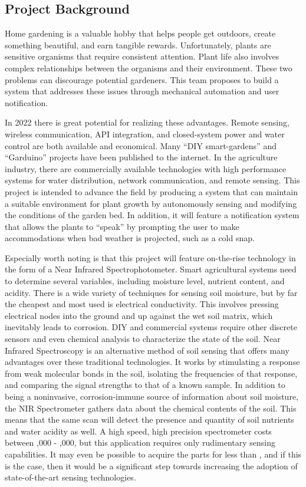 \subsection{Project Background}
Home gardening is a valuable hobby that helps people get outdoors, create something beautiful, and earn tangible rewards. Unfortunately, plants are sensitive organisms that require consistent attention. Plant life also involves complex relationships between the organisms and their environment. These two problems can discourage potential gardeners. This team proposes to build a system that addresses these issues through mechanical automation and user notification.

In 2022 there is great potential for realizing these advantages. Remote sensing, wireless communication, API integration, and closed-system power and water control are both available and economical. Many “DIY smart-gardens” and “Garduino” projects have been published to the internet. In the agriculture industry, there are commercially available technologies with high performance systems for water distribution, network communication, and remote sensing. This project is intended to advance the field by producing a system that can maintain a suitable environment for plant growth by autonomously sensing and modifying the conditions of the garden bed. In addition, it will feature a notification system that allows the plants to “speak” by prompting the user to make accommodations when bad weather is projected, such as a cold snap.

Especially worth noting is that this project will feature on-the-rise technology in the form of a Near Infrared Spectrophotometer. Smart agricultural systems need to determine several variables, including moisture level, nutrient content, and acidity. There is a wide variety of techniques for sensing soil moisture, but by far the cheapest and most used is electrical conductivity. This involves pressing electrical nodes into the ground and up against the wet soil matrix, which inevitably leads to corrosion. DIY and commercial systems require other discrete sensors and even chemical analysis to characterize the state of the soil. Near Infrared Spectroscopy is an alternative method of soil sensing that offers many advantages over these traditional technologies. It works by stimulating a response from weak molecular bonds in the soil, isolating the frequencies of that response, and comparing the signal strengths to that of a known sample. In addition to being a noninvasive, corrosion-immune source of information about soil moisture, the NIR Spectrometer gathers data about the chemical contents of the soil. This means that the same scan will detect the presence and quantity of soil nutrients and water acidity as well. A high speed, high precision spectrometer costs between ,000 - ,000, but this application requires only rudimentary sensing capabilities. It may even be possible to acquire the parts for less than , and if this is the case, then it would be a significant step towards increasing the adoption of state-of-the-art sensing technologies.

